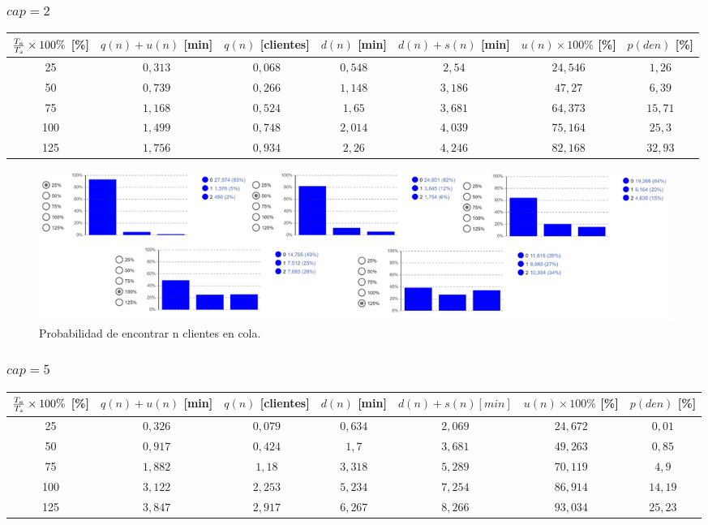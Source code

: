 \subsubsection{$cap = 2$}

\begin{tabular}{||c||c|c|c|c|c|c||}
    \hline \hline
    ${T_a \over T_s}\times100\%$ [\%] & $q(n)+u(n)$ [min] & $q(n)$ [clientes] & $d(n)$ [min] & $d(n)+s(n)$ [min] & $u(n)\times100\%$ [\%] & $p(den)$ [\%] \\
    \hline \hline
    25 & $0,313$ & $0,068$ & $0,548$ & $2,54$ & $24,546$ & $1,26$ \\
    \hline
    50 & $0,739$ & $0,266$ & $1,148$ & $3,186$ & $47,27$ & $6,39$ \\
    \hline
    75 & $1,168$ & $0,524$ & $1,65$ & $3,681$ & $64,373$ & $15,71$ \\
    \hline
    100 & $1,499$ & $0,748$ & $2,014$ & $4,039$ & $75,164$ & $25,3$ \\
    \hline
    125 & $1,756$ & $0,934$ & $2,26$ & $4,246$ & $82,168$ & $32,93$ \\
    \hline \hline
\end{tabular}

\begin{figure}[H]
  \includegraphics[width=\linewidth]{images/anylogic-colas-2}
  \caption{Probabilidad de encontrar n clientes en cola.}
\end{figure}

\subsubsection{$cap = 5$}

\begin{tabular}{||c||c|c|c|c|c|c||}
    \hline \hline
    ${T_a \over T_s}\times100\%$ [\%] & $q(n)+u(n)$ [min] & $q(n)$ [clientes] & $d(n)$ [min] & $d(n)+s(n) [min]$ & $u(n)\times100\%$ [\%] & $p(den)$ [\%] \\
    \hline \hline
    25 & $0,326$ & $0,079$ & $0,634$ & $2,069$ & $24,672$ & $0,01$ \\
    \hline
    50 & $0,917$ & $0,424$ & $1,7$ & $3,681$ & $49,263$ & $0,85$ \\
    \hline
    75 & $1,882$ & $1,18$ & $3,318$ & $5,289$ & $70,119$ & $4,9$ \\
    \hline
    100 & $3,122$ & $2,253$ & $5,234$ & $7,254$ & $86,914$ & $14,19$ \\
    \hline
    125 & $3,847$ & $2,917$ & $6,267$ & $8,266$ & $93,034$ & $25,23$ \\
    \hline \hline
\end{tabular}

